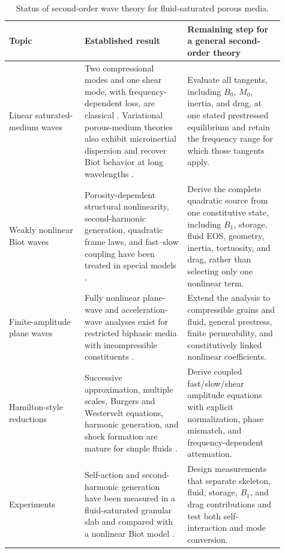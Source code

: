 \documentclass[11pt]{article}
\begin{document}
\begin{table}[ht]
\centering
\small
\renewcommand{\arraystretch}{1.18}
\begin{tabular}{>{\raggedright\arraybackslash}p{0.25\linewidth}
                >{\raggedright\arraybackslash}p{0.34\linewidth}
                >{\raggedright\arraybackslash}p{0.32\linewidth}}
\toprule
Topic & Established result & Remaining step for a general second-order theory \\
\midrule
Linear saturated-medium waves
& Two compressional modes and one shear mode, with frequency-dependent loss,
are classical \cite{biot1956a,biot1956b}.  Variational porous-medium theories
also exhibit microinertial dispersion and recover Biot behavior at long
wavelengths \cite{bedforddrumheller1979}.
& Evaluate all tangents, including \(B_0\), \(M_0\), inertia, and drag, at one
stated prestressed equilibrium and retain the frequency range for which those
tangents apply. \\
\addlinespace
Weakly nonlinear Biot waves
& Porosity-dependent structural nonlinearity, second-harmonic generation,
quadratic frame laws, and fast--slow coupling have been treated in special
models \cite{donskoy1997,dazel2010,tong2017}.
& Derive the complete quadratic source from one constitutive state, including
\(B_1\), storage, fluid EOS, geometry, inertia, tortuosity, and drag, rather than
selecting only one nonlinear term. \\
\addlinespace
Finite-amplitude plane waves
& Fully nonlinear plane-wave and acceleration-wave analyses exist for
restricted biphasic media with incompressible constituents
\cite{berjamin2021}.
& Extend the analysis to compressible grains and fluid, general prestress,
finite permeability, and constitutively linked nonlinear coefficients. \\
\addlinespace
Hamilton-style reductions
& Successive approximation, multiple scales, Burgers and Westervelt equations,
harmonic generation, and shock formation are mature for simple fluids
\cite{hamiltonblackstock}.
& Derive coupled fast/slow/shear amplitude equations with explicit
normalization, phase mismatch, and frequency-dependent attenuation. \\
\addlinespace
Experiments
& Self-action and second-harmonic generation have been measured in a
fluid-saturated granular slab and compared with a nonlinear Biot model
\cite{legland2012}.
& Design measurements that separate skeleton, fluid, storage, \(B_1\), and
drag contributions and test both self-interaction and mode conversion. \\
\bottomrule
\end{tabular}
\caption{Status of second-order wave theory for fluid-saturated porous media.}
\label{tab:status}
\end{table}
\end{document}
